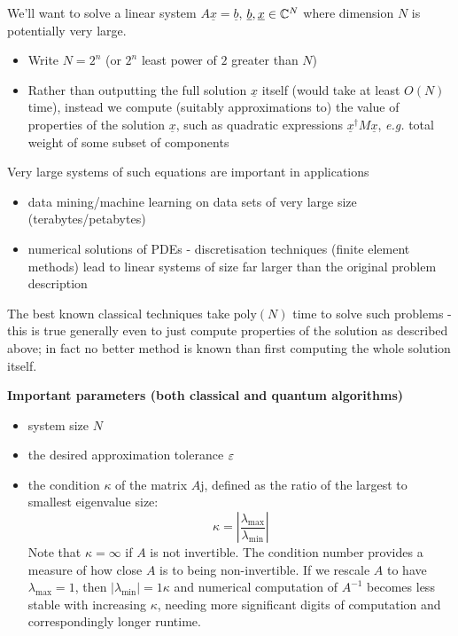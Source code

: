 \documentclass[]{article}
\renewcommand{\it}[1]{\textit{#1}}
\newcommand{\poly}{\textrm{poly}}
\begin{document}
We'll want to solve a linear system $A\underline{x} = \underline{b}$, $\underline{b},\underline{x} \in \mathbb{C}^N$ where dimension $N$ is potentially very large.

\begin{itemize}
	\item Write $N = 2^n$ (or $2^n$ least power of $2$ greater than $N$)
	\item Rather than outputting the full solution $\underline{x}$ itself (would take at least $O(N)$ time), instead we compute (suitably approximations to) the value of properties of the solution $\underline{x}$, such as quadratic expressions $\underline{x}^\dagger M\underline{x}$, \it{e.g.} total weight of some subset of components
\end{itemize}

Very large systems of such equations are important in applications

\begin{itemize}
	\item data mining/machine learning on data sets of very large size (terabytes/petabytes)
	\item numerical solutions of PDEs - discretisation techniques (finite element methods) lead to linear systems of size far larger than the original problem description
\end{itemize}

The best known classical techniques take $\poly(N)$ time to solve such problems - this is true generally even to just compute properties of the solution as described above; in fact no better method is known than first computing the whole solution itself.

\textbf{Important parameters (both classical and quantum algorithms)}

\begin{itemize}
	\item system size $N$
	\item the desired approximation tolerance $\varepsilon$
	\item the condition $\kappa$ of the matrix $A$j, defined as the ratio of the largest to smallest eigenvalue size: $$\kappa = \left|\frac{\lambda_{\max}}{\lambda_{\min}}\right|$$
	Note that $\kappa = \infty$ if $A$ is not invertible. The condition number provides a measure of how close $A$ is to being non-invertible. If we rescale $A$ to have $\lambda_{\max}= 1$, then $|\lambda_{\min}| = 1\kappa$ and numerical computation of $A^{-1}$ becomes less stable with increasing $\kappa$, needing more significant digits of computation and correspondingly longer runtime.
\end{itemize}
\end{document}
